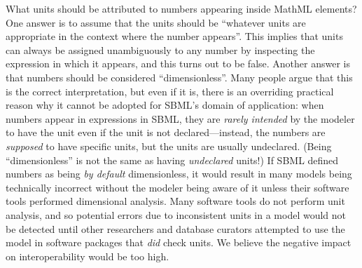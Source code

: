 What units should be attributed to numbers appearing inside MathML
 elements?  One answer is to assume that the units
should be ``whatever units are appropriate in the context where the
number appears''.  This implies that units can always be assigned
unambiguously to any number by inspecting the expression in which
it appears, and this turns out to be false.  Another answer is
that numbers should be considered ``dimensionless''.  Many people
argue that this is the correct interpretation, but even if it is,
there is an overriding practical reason why it cannot be adopted
for SBML's domain of application: when numbers appear in
expressions in SBML, they are \emph{rarely intended} by the
modeler to have the unit  even if the unit is
not declared---instead, the numbers are \emph{supposed} to have
specific units, but the units are usually undeclared.  (Being
``dimensionless'' is not the same as having \emph{undeclared}
units!)  If SBML defined numbers as being \emph{by default}
dimensionless, it would result in many models being technically
incorrect without the modeler being aware of it unless their
software tools performed dimensional analysis.  Many software
tools do not perform unit analysis, and so potential errors due to
inconsistent units in a model would not be detected until other
researchers and database curators attempted to use the model in
software packages that \emph{did} check units.  We believe the
negative impact on interoperability would be too high.

